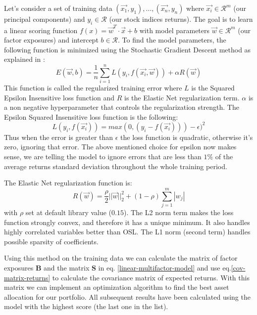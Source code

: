 Let's consider a set of training data $(\vec{x_1}, y_1),\dots,(\vec{x_n}, y_n)$ where $\vec{x_i} \in \mathcal{R}^m$ (our principal components) and $y_i \in \mathcal{R}$ (our stock indices returns). The goal is to learn a linear scoring function $f(x) = \vec{w}^{T}\cdot\vec{x} + b$ with model parameters $\vec{w} \in \mathcal{R}^m$ (our factor exposures) and intercept $b \in \mathcal{R}$.
To find the model parameters, the following function is minimized using the Stochastic Gradient Descent method as explained in \cite{sgd-paper}:
\begin{equation}
	E(\vec{w},b) = \frac{1}{n} \sum_{i=1}^n L(y_i, f(\vec{x_i}, \vec{w})) + \alpha R(\vec{w})
	\label{reg-train-error}
\end{equation}
This function is called the regularized training error where $L$ is the Squared Epsilon Insensitive loss function and $R$ is the Elastic Net regularization term. $\alpha$ is a non negative hyperparameter that controls the regularization strength.
The Epsilon Squared Insensitive loss function is the following:
\begin{equation}
	L(y_i, f(\vec{x_i})) = max(0, (y_i - f(\vec{x_i}))) - \epsilon)^2
	\label{sq-ins-epsilon}
\end{equation}
Thus when the error is greater than $\epsilon$ the loss function is quadratic, otherwise it's zero, ignoring that error. The above mentioned choice for epsilon now makes sense, we are telling the model to ignore errors that are less than $1\%$ of the average returns standard deviation throughout the whole training period.

The Elastic Net regularization function is:
\begin{equation}
	R(\vec{w}) = \frac{\rho}{2} ||\vec{w}||_{2}^2 + (1-\rho)\sum_{j = 1}^{m} |w_j|
\end{equation}
with $\rho$ set at default library value ($0.15$). The L2 norm term makes the loss function strongly convex, and therefore it has a unique minimum. It also handles highly correlated variables better than OSL. The L1 norm (second term) handles possible sparsity of coefficients.

Using this method on the training data we can calculate the matrix of factor exposures $\mathbf{B}$ and the matrix $\mathbf{S}$ in eq. \eqref{linear-multifactor-model} and use eq.\eqref{cov-matrix-returns} to calculate the covariance matrix of expected returns. With this matrix we can implement an optimization algorithm to find the best asset allocation for our portfolio.
All subsequent results have been calculated using the model with the highest score (the last one in the list).

